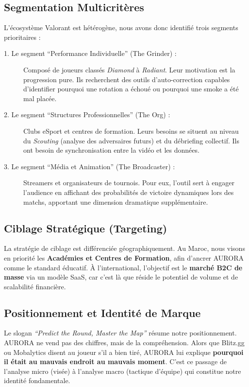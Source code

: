 \documentclass[a4paper,11pt]{article}
\begin{document}
\subsection{Segmentation Multicritères}
L'écosystème Valorant est hétérogène, nous avons donc identifié trois segments prioritaires :
\begin{description}
    \item[1. Le segment \enquote{Performance Individuelle} (The Grinder) :] Composé de joueurs classés \textit{Diamond} à \textit{Radiant}. Leur motivation est la progression pure. Ils recherchent des outils d'auto-correction capables d'identifier pourquoi une rotation a échoué ou pourquoi une smoke a été mal placée.
    
    \item[2. Le segment \enquote{Structures Professionnelles} (The Org) :] Clubs eSport et centres de formation. Leurs besoins se situent au niveau du \textit{Scouting} (analyse des adversaires futurs) et du débriefing collectif. Ils ont besoin de synchronisation entre la vidéo et les données.
    
    \item[3. Le segment \enquote{Média et Animation} (The Broadcaster) :] Streamers et organisateurs de tournois. Pour eux, l'outil sert à engager l'audience en affichant des probabilités de victoire dynamiques lors des matchs, apportant une dimension dramatique supplémentaire.
\end{description}

\subsection{Ciblage Stratégique (Targeting)}
La stratégie de ciblage est différenciée géographiquement. Au Maroc, nous visons en priorité les \textbf{Académies et Centres de Formation}, afin d'ancrer AURORA comme le standard éducatif. À l'international, l'objectif est le \textbf{marché B2C de masse} via un modèle SaaS, car c'est là que réside le potentiel de volume et de scalabilité financière.

\subsection{Positionnement et Identité de Marque}
Le slogan \textit{\enquote{Predict the Round, Master the Map}} résume notre positionnement. AURORA ne vend pas des chiffres, mais de la compréhension. Alors que Blitz.gg ou Mobalytics disent au joueur s'il a bien tiré, AURORA lui explique \textbf{pourquoi il était au mauvais endroit au mauvais moment}. C'est ce passage de l'analyse micro (visée) à l'analyse macro (tactique d'équipe) qui constitue notre identité fondamentale.
\end{document}

